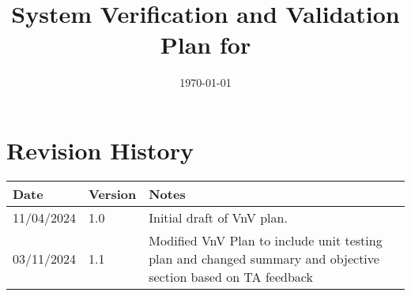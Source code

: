 \documentclass[12pt, titlepage]{article}
\begin{document}
\title{System Verification and Validation Plan for \progname{}} 
\author{\authname}
\date{\today}
	
\maketitle


\section*{Revision History}

\begin{tabularx}{\textwidth}{p{3cm}p{2cm}X}
\toprule {\bf Date} & {\bf Version} & {\bf Notes}\\
\midrule
11/04/2024 & 1.0 & Initial draft of VnV plan.\\
03/11/2024 & 1.1 & Modified VnV Plan to include unit testing plan and changed summary and objective section based on TA feedback\\

\bottomrule
\end{tabularx}

~\\


\newpage

\tableofcontents

\listoftables



\newpage
\end{document}
